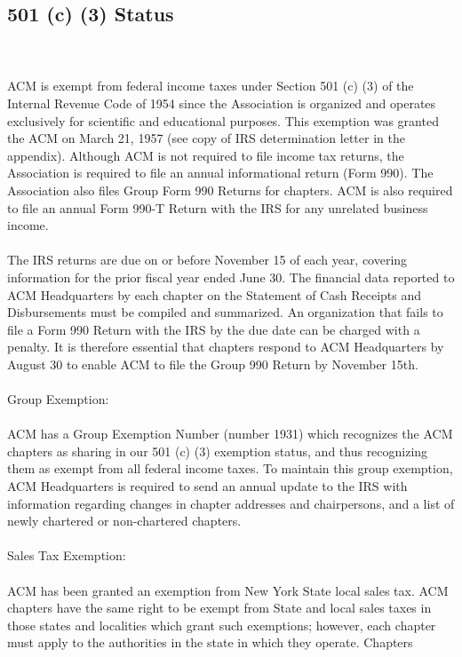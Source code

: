 \subsection*{501 (c) (3) Status}
\\
\\
ACM is exempt from federal income taxes under Section 501 (c) (3) of the
Internal Revenue Code of 1954 since the Association is organized and operates
exclusively for scientific and educational purposes. This exemption was granted
the ACM on March 21, 1957 (see copy of IRS determination letter in the appendix).
Although ACM is not required to file income tax returns, the Association is
required to file an annual informational return (Form 990). The Association also
files Group Form 990 Returns for chapters. ACM is also required to file an annual
Form 990-T Return with the IRS for any unrelated business income.
\\
\\
The IRS returns are due on or before November 15 of each year, covering
information for the prior fiscal year ended June 30. The financial data reported
to ACM Headquarters by each chapter on the Statement of Cash Receipts and
Disbursements must be compiled and summarized. An organization that fails to
file a Form 990 Return with the IRS by the due date can be charged with a
penalty. It is therefore essential that chapters respond to ACM Headquarters
by August 30 to enable ACM to file the Group 990 Return by November 15th.
\\
\\
Group Exemption:
\\
\\
ACM has a Group Exemption Number (number 1931) which recognizes the ACM chapters
as sharing in our 501 (c) (3) exemption status, and thus recognizing them as
exempt from all federal income taxes. To maintain this group exemption, ACM
Headquarters is required to send an annual update to the IRS with information
regarding changes in chapter addresses and chairpersons, and a list of newly
chartered or non-chartered chapters.
\\
\\
Sales Tax Exemption:
\\
\\
ACM has been granted an exemption from New York State local sales tax. ACM
chapters have the same right to be exempt from State and local sales taxes in
those states and localities which grant such exemptions; however, each chapter
must apply to the authorities in the state in which they operate. Chapters
